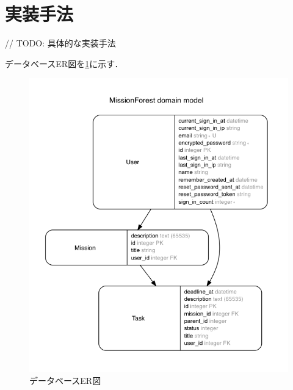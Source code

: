 \section{実装手法}
// TODO: 具体的な実装手法

データベースER図を\ref{img:system_model}に示す．

\begin{figure}[t]
	\begin{center}
		\includegraphics[width=0.9\linewidth]{assets/img/system_model.png}
		\caption{データベースER図}
		\label{img:system_model}
	\end{center}
\end{figure}
